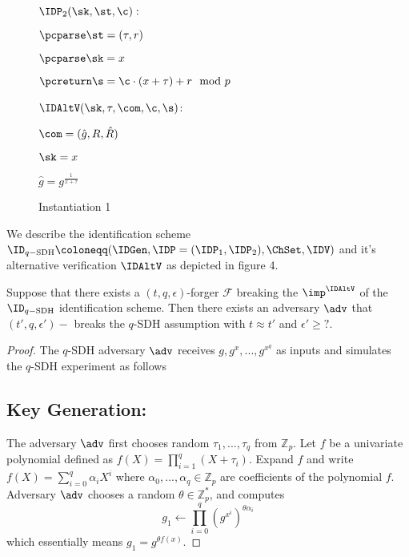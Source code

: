 \begin{figure}[htb!]
{\begin{minipage}[t]{0.5\textwidth}
              \underline{$\IDP_2(\sk,\st,\c):$}
            \begin{nicodemus}
            	\item $\pcparse \st = (\tau,r)$
		\item $\pcparse \sk = x$
                \item $\pcreturn \s =\c\cdot(x+\tau) + r \mod p$
            \end{nicodemus}
                        \underline{$\IDAltV(\sk,\tau,\com, \c,\s)$}:
            \begin{nicodemus}
                \item \pcparse $\com = (\hat{g},R,\hat{R})$
                \item \pcparse $\sk = x$
                \item \pcif $\hat{g} = g^{\frac{1}{x+\tau}}$ 
                \item \quad \pcthen {}
                \item \pcelse {}
            \end{nicodemus}
        \end{minipage}
    }
    \caption{Instantiation 1}
    \label{fig:prf-security}
\end{figure}

We describe the identification scheme  $\ID_{q-\text{SDH}} \coloneqq(\IDGen, \IDP=(\IDP_1,\IDP_2) ,\ChSet, \IDV)$ and it's alternative verification $\IDAltV$ as depicted in figure 4.

\begin{theorem}
Suppose that there exists a $(t, q, \epsilon)$-forger $\mathcal{F}$ breaking the $\imp^{\IDAltV}$ of the $\ID_{q-\text{SDH}}$ identification scheme. Then there exists an adversary $\adv$ that $(t',q,\epsilon')-$ breaks the $q$-SDH assumption with $t \approx t'$ and 
$\epsilon' \geq ?.$
\end{theorem}
\begin{proof}
The $q$-SDH adversary $\adv$ receives $g,g^x,...,g^{x^q}$ as inputs and simulates the $q$-SDH experiment as follows
\subsection*{Key Generation:} The adversary $\adv$ first chooses random $\tau_1,...,\tau_q$ from $\mathbb{Z}_p$. Let $f$ be a univariate polynomial defined as 
$f(X) = \prod_{i=1}^q (X+\tau_i)$. Expand $f$ and write $f(X) = \sum_{i=0}^q \alpha_i X^i$ where
$\alpha_0,...,\alpha_q \in \mathbb{Z}_p$ are coefficients of the polynomial $f$. Adversary $\adv$ chooses a random $\theta \in \mathbb{Z}^*_p$, and computes
$$g_1 \leftarrow \prod_{i=0}^q (g^{x^i})^{\theta\alpha_i}$$
which essentially means $g_1 = g^{\theta f(x)}$.
\end{proof}